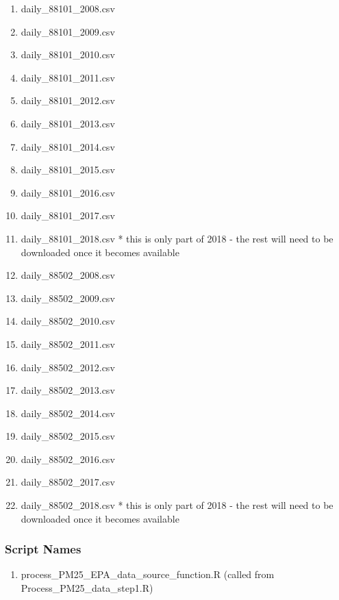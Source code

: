\begin{enumerate}[noitemsep]
\item daily\_88101\_2008.csv
\item daily\_88101\_2009.csv
\item daily\_88101\_2010.csv
\item daily\_88101\_2011.csv
\item daily\_88101\_2012.csv
\item daily\_88101\_2013.csv
\item daily\_88101\_2014.csv
\item daily\_88101\_2015.csv
\item daily\_88101\_2016.csv
\item daily\_88101\_2017.csv
\item daily\_88101\_2018.csv * this is only part of 2018 - the rest will need to be downloaded once it becomes available
\item daily\_88502\_2008.csv
\item daily\_88502\_2009.csv
\item daily\_88502\_2010.csv
\item daily\_88502\_2011.csv
\item daily\_88502\_2012.csv
\item daily\_88502\_2013.csv
\item daily\_88502\_2014.csv
\item daily\_88502\_2015.csv
\item daily\_88502\_2016.csv
\item daily\_88502\_2017.csv
\item daily\_88502\_2018.csv * this is only part of 2018 - the rest will need to be downloaded once it becomes available
\end{enumerate} 


\subsubsection*{Script Names}

\begin{enumerate}
\item process\_PM25\_EPA\_data\_source\_function.R (called from Process\_PM25\_data\_step1.R)
\end{enumerate}

